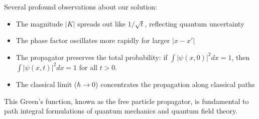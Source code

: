 \begin{example}
\begin{solution}
\noindent Several profound observations about our solution:
\begin{itemize}
   \item The magnitude \(|K|\) spreads out like \(1/\sqrt{t}\), reflecting quantum uncertainty
   \item The phase factor oscillates more rapidly for larger \(|x-x'|\)
   \item The propagator preserves the total probability: if $\int |\psi(x,0)|^2 dx = 1$, then $\int |\psi(x,t)|^2 dx = 1$ for all $t > 0$.
   \item The classical limit (\(\hbar \to 0\)) concentrates the propagation along classical paths
\end{itemize}

\noindent This Green's function, known as the free particle propagator, is fundamental to path integral formulations of quantum mechanics and quantum field theory.
\end{solution}
\end{example}
\exampleline


\newpage

\formsdefs{}

